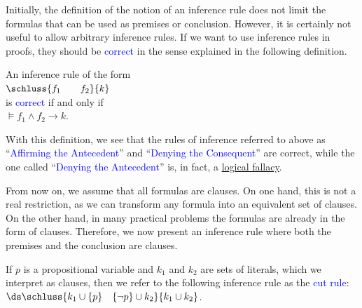 \noindent
Initially, the definition of the notion of an inference rule does not limit the formulas that can be used as premises
or conclusion. However, it is certainly not useful to allow arbitrary inference rules. If we want to use
inference rules in proofs, they should be \textcolor{blue}{correct} in the sense explained in the following definition.

\begin{Definition}
  An inference rule of the form \\[0.2cm]
  \hspace*{1.3cm} $\schluss{f_1 \qquad f_2}{k}$ \\[0.2cm]
  is \textcolor{blue}{correct} if and only if 
  \\[0.2cm]
  \hspace*{1.3cm}
  $\models f_1 \wedge f_2 \rightarrow k$. \eox
  \\[0.2cm]


\end{Definition}
With this definition, we see that
the rules of inference referred to above as ``\textcolor{blue}{Affirming the Antecedent}'' and
``\textcolor{blue}{Denying the Consequent}''
are correct, while the one called ``\textcolor{blue}{Denying the Antecedent}''
is, in fact, a \href{https://en.wikipedia.org/wiki/List_of_fallacies}{logical fallacy}.

From now on, we assume that all formulas are clauses. On one hand, this is
not a real restriction, as we can transform any formula into an equivalent set of
clauses. On the other hand, in many practical problems the formulas are already in the form of
clauses. Therefore, we now present an inference rule where both the premises and the conclusion are clauses.
     
\begin{Definition}
    If $p$ is a propositional variable and $k_1$ and $k_2$ are sets of literals,
    which we interpret as clauses, then we refer to the following inference rule
    as the \textcolor{blue}{cut rule}: 
    \\[0.2cm]
    \hspace*{1.3cm}
    $\ds \schluss{ k_1 \cup \{p\} \quad \{\neg p\} \cup k_2 }{k_1 \cup k_2}$. 
    \eox
\end{Definition}

